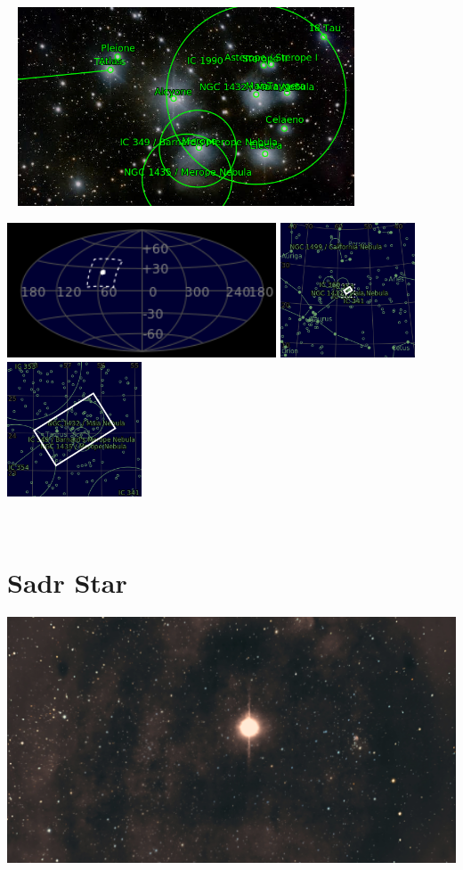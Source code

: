 \begin{center}
 \ \newpage
\includegraphics[width=0.75\textwidth]{../Imaging//Annotated/Pleiades_Cluster_Annotated.jpg}

\includegraphics[height=4cm]{../Imaging//Annotated/Pleiades_Cluster_Globe.jpg}
\includegraphics[height=4cm]{../Imaging//Annotated/Pleiades_Cluster_Close.jpg}
\includegraphics[height=4cm]{../Imaging//Annotated/Pleiades_Cluster_Closer.jpg}
\end{center}
\ \\\section{Sadr Star}
\includegraphics[width=\textwidth]{../Imaging//Original/Sadr_Star.jpg}
